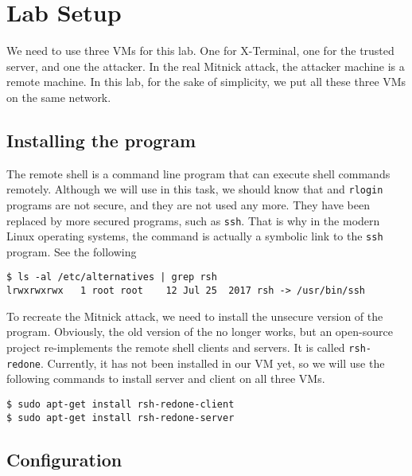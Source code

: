 \section{Lab Setup}

We need to use three VMs for this lab. One for X-Terminal, one for
the trusted server, and one the attacker. In the real Mitnick attack,
the attacker machine is a remote machine. In this lab, for the 
sake of simplicity, we put all these three VMs on the 
same network. 


\subsection{Installing the \rsh program}

The remote shell \rsh is a command line program that can execute shell commands
remotely. Although we will use \rsh in this task, we should know that 
\rsh and \texttt{rlogin} programs are not secure, and they 
are not used any more. They have been replaced by
more secured programs, such as \texttt{ssh}.   
That is why in the modern Linux operating systems, the \rsh command 
is actually a symbolic link to the \texttt{ssh} program.  See the following

\begin{lstlisting}
$ ls -al /etc/alternatives | grep rsh
lrwxrwxrwx   1 root root    12 Jul 25  2017 rsh -> /usr/bin/ssh
\end{lstlisting}



To recreate the Mitnick attack, we need to install the unsecure version
of the \rsh program. Obviously, the old version of 
the \rsh no longer works, but an open-source project
re-implements the remote shell clients and servers. 
It is called \texttt{rsh-redone}. 
Currently, it has not been installed in our VM yet, so 
we will use the following commands to install \rsh server and client on all 
three VMs. 

\begin{lstlisting}
$ sudo apt-get install rsh-redone-client
$ sudo apt-get install rsh-redone-server
\end{lstlisting}



\subsection{Configuration}
\label{subsec:configuration}


